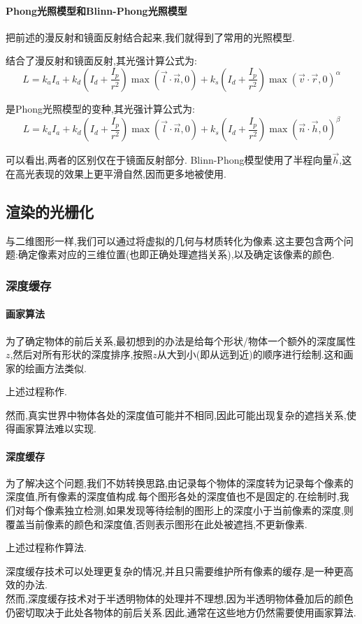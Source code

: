 \documentclass{ctexart}
\begin{document}
\paragraph{Phong光照模型和Blinn-Phong光照模型}
把前述的漫反射和镜面反射结合起来,我们就得到了常用的光照模型.
\begin{definition}[Phong光照模型]
    结合了漫反射和镜面反射,其光强计算公式为:
    \[L=k_aI_a+k_d\left(I_d+\dfrac{I_p}{r^2}\right)\max(\vec{l}\cdot\vec{n},0)+k_s\left(I_d+\dfrac{I_p}{r^2}\right)\max(\vec{v}\cdot\vec{r},0)^\alpha\]
\end{definition}
\begin{definition}
    是Phong光照模型的变种,其光强计算公式为:
    \[L=k_aI_a+k_d\left(I_d+\dfrac{I_p}{r^2}\right)\max(\vec{l}\cdot\vec{n},0)+k_s\left(I_d+\dfrac{I_p}{r^2}\right)\max(\vec{n}\cdot\vec{h},0)^\beta\]
\end{definition}
可以看出,两者的区别仅在于镜面反射部分. Blinn-Phong模型使用了半程向量$\vec{h}$,这在高光表现的效果上更平滑自然,因而更多地被使用.
\subsection{渲染的光栅化}
与二维图形一样,我们可以通过将虚拟的几何与材质转化为像素.这主要包含两个问题:确定像素对应的三维位置(也即正确处理遮挡关系),以及确定该像素的颜色.
\subsubsection{深度缓存}
\paragraph{画家算法}
为了确定物体的前后关系,最初想到的办法是给每个形状/物体一个额外的深度属性$z$,然后对所有形状的深度排序,按照$z$从大到小(即从远到近)的顺序进行绘制.这和画家的绘画方法类似.
\begin{definition}[画家算法]
    上述过程称作.
\end{definition}
然而,真实世界中物体各处的深度值可能并不相同,因此可能出现复杂的遮挡关系,使得画家算法难以实现.
\paragraph{深度缓存}
为了解决这个问题,我们不妨转换思路,由记录每个物体的深度转为记录每个像素的深度值,所有像素的深度值构成.每个图形各处的深度值也不是固定的.在绘制时,我们对每个像素独立检测,如果发现等待绘制的图形上的深度小于当前像素的深度,则覆盖当前像素的颜色和深度值,否则表示图形在此处被遮挡,不更新像素.
\begin{definition}
    上述过程称作算法.
\end{definition}
深度缓存技术可以处理更复杂的情况,并且只需要维护所有像素的缓存,是一种更高效的办法.\\
\indent 然而,深度缓存技术对于半透明物体的处理并不理想,因为半透明物体叠加后的颜色仍密切取决于此处各物体的前后关系.因此,通常在这些地方仍然需要使用画家算法.
\end{document}
